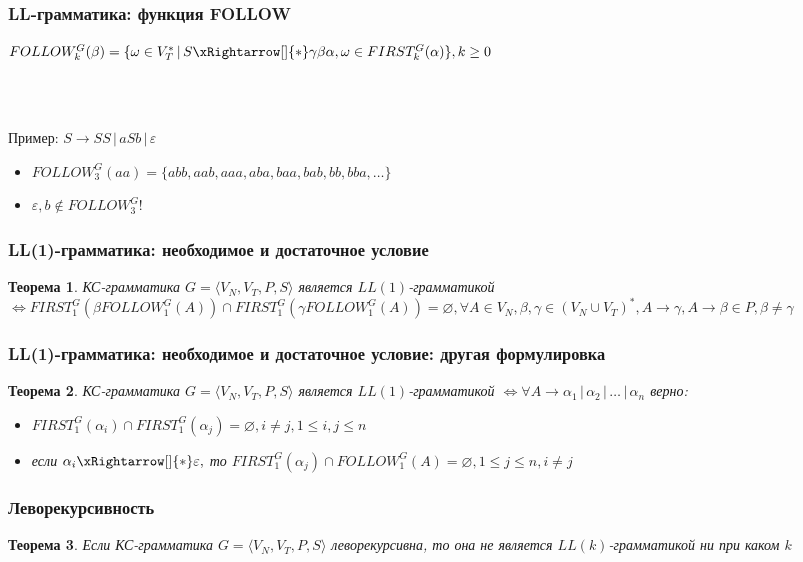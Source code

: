 \documentclass{beamer}
\newtheorem{rutheorem}{Теорема}
\newcommand{\derive}[0]{\xRightarrow[]{*}}
\begin{document}
\begin{frame}[fragile]
  \transwipe[direction=90]
  \frametitle{LL-грамматика: функция FOLLOW}
  $FOLLOW^G_k(\beta) = \{ \omega \in V_T^* \, | \, S \derive \gamma \beta \alpha, \omega \in FIRST^G_k(\alpha) \}, k \geq 0$

  ~\\~
  
   Пример: $S \rightarrow S S \, | \, a S b \, | \, \varepsilon$
   
   \begin{itemize}
     \item  $FOLLOW^G_3( a a ) = \{ a b b, a a b, a a a, a b a, b a a, b a b, b b, b b a, \dots \}$
     \item $\varepsilon, b \notin FOLLOW^G_3$!
   \end{itemize}
\end{frame}


\begin{frame}[fragile]
  \transwipe[direction=90]
  \frametitle{LL(1)-грамматика: необходимое и достаточное условие}
  \begin{rutheorem}
    КС-грамматика  $G = \langle V_N, V_T, P, S \rangle$ является $LL(1)$-грамматикой $\Leftrightarrow FIRST^G_1 (\beta FOLLOW^G_1(A)) \cap FIRST^G_1(\gamma FOLLOW^G_1(A)) = \varnothing, \forall A \in V_N, \beta, \gamma \in (V_N \cup V_T)^*, A \rightarrow \gamma, A \rightarrow \beta \in P, \beta \neq \gamma$
  \end{rutheorem}
  
\end{frame}

\begin{frame}[fragile]
  \transwipe[direction=90]
  \frametitle{LL(1)-грамматика: необходимое и достаточное условие: другая формулировка}
  \begin{rutheorem}
    КС-грамматика  $G = \langle V_N, V_T, P, S \rangle$ является $LL(1)$-грамматикой $\Leftrightarrow 
    \forall A \rightarrow \alpha_1 \, | \, \alpha_2 \, | \, \dots \, | \, \alpha_n$ верно: 
    \begin{itemize}
      \item $FIRST^G_1(\alpha_i) \cap FIRST^G_1(\alpha_j) = \varnothing, i \neq j, 1 \leq i, j \leq n$
      \item если $\alpha_i \derive \varepsilon,$ то $FIRST^G_1(\alpha_j) \cap FOLLOW^G_1(A) = \varnothing, 1 \leq j \leq n, i \neq j$
    \end{itemize}
   \end{rutheorem}
  
\end{frame}


\begin{frame}[fragile]
  \transwipe[direction=90]
  \frametitle{Леворекурсивность}
  \begin{rutheorem}
    Если  КС-грамматика  $G = \langle V_N, V_T, P, S \rangle$ леворекурсивна, то она не является $LL(k)$-грамматикой ни при каком $k$
  \end{rutheorem}
\end{frame}

 
   
\end{document}

